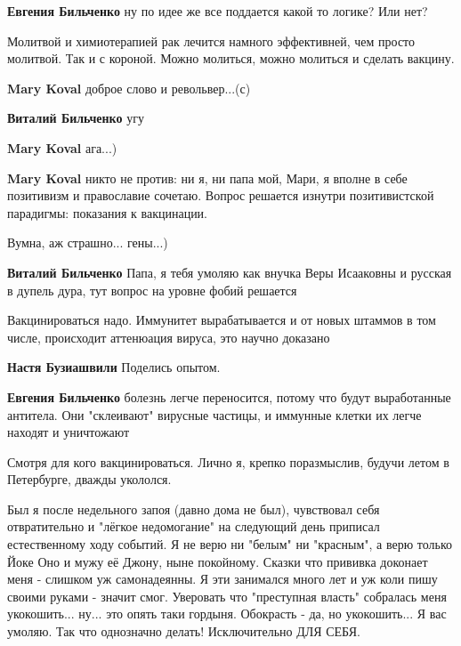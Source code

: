 \begin{itemize}
\begin{itemize}
\textbf{Евгения Бильченко} ну по идее же все поддается какой то логике? Или нет?
\end{itemize} %


Молитвой и химиотерапией рак лечится намного эффективней, чем просто молитвой.
Так и с короной. Можно молиться, можно молиться и сделать вакцину.

\begin{itemize} %
\textbf{Mary Koval} доброе слово и револьвер...(с)

\textbf{Виталий Бильченко} угу

\textbf{Mary Koval} ага...)


\textbf{Mary Koval} никто не против: ни я, ни папа мой, Мари, я вполне в себе позитивизм и православие сочетаю. Вопрос решается изнутри позитивистской парадигмы: показания к вакцинации.

Вумна, аж страшно... гены...)

\textbf{Виталий Бильченко} Папа, я тебя умоляю как внучка Веры Исааковны и русская в дупель дура, тут вопрос на уровне фобий решается
\end{itemize} %


Вакцинироваться надо. Иммунитет вырабатывается и от новых штаммов в том числе,
происходит аттенюация вируса, это научно доказано

\begin{itemize} %
\textbf{Настя Бузиашвили} Поделись опытом.

\textbf{Евгения Бильченко} болезнь легче переносится, потому что будут выработанные антитела. Они "склеивают" вирусные частицы, и иммунные клетки их легче находят и уничтожают
\end{itemize} %


Смотря для кого вакцинироваться. Лично я, крепко поразмыслив, будучи летом в Петербурге, дважды укололся.

Был я после недельного запоя (давно дома не был), чувствовал себя отвратительно
и "лёгкое недомогание" на следующий день приписал естественному ходу событий. Я
не верю ни "белым" ни "красным", а верю только Йоке Оно и мужу её Джону, ныне
покойному. Сказки что прививка доконает меня - слишком уж самонадеянны. Я эти
занимался много лет и уж коли пишу своими руками - значит смог. Уверовать что
"преступная власть" собралась меня укокошить... ну... это опять таки гордыня.
Обокрасть - да, но укокошить... Я вас умоляю. Так что однозначно делать!
Исключительно ДЛЯ СЕБЯ.


\end{itemize}
